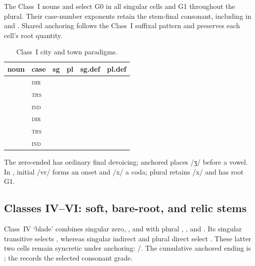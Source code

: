 The Class~I nouns   and  
select G0 in all singular cells and G1 throughout the plural.
Their case-number exponents retain the stem-final consonant, including
 in  and . Shared anchoring follows the
Class~I suffixal pattern and preserves each cell's root quantity.

\begin{table}[ht]
  \footnotesize
  \caption{Class~I city and town paradigms.}
  \label{tab:city-town-paradigms}
  \begin{tabularx}{\textwidth}{l l L L L L}
    \toprule
    {\sc noun} & {\sc case} & {\sc sg} & {\sc pl}
      & {\sc sg.def} & {\sc pl.def} \\
    \midrule
     & \textsc{dir} &  &  &  &  \\
     & \textsc{trs} &  &  &  &  \\
     & \textsc{ind} &  &  &  &  \\
    \addlinespace
     & \textsc{dir} &  &  &  &  \\
     & \textsc{trs} &  &  &  &  \\
     & \textsc{ind} &  &  &  &  \\
    \bottomrule
  \end{tabularx}
\end{table}

The zero-ended  has ordinary final devoicing;
anchored  places /ʒ/ before a vowel.
In , initial /vr/ forms an onset and /x/ a coda;
plural  retains /x/ and has root G1.

\subsection{Classes IV--VI: soft, bare-root, and relic stems}
\label{sec:nm-classes-iv-vi}

Class~IV  `blade' combines singular zero, , and  with
plural , , and . Its singular transitive selects
, whereas singular indirect and plural direct select .
These latter two cells remain syncretic under anchoring:
/. The cumulative anchored ending is ; the
 records the selected consonant grade.

